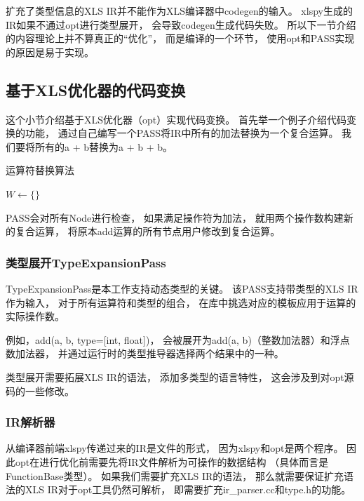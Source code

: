 扩充了类型信息的XLS IR并不能作为XLS编译器中codegen的输入。
xlspy生成的IR如果不通过opt进行类型展开，
会导致codegen生成代码失败。
所以下一节介绍的内容理论上并不算真正的“优化”，
而是编译的一个环节，
使用opt和PASS实现的原因是易于实现。

\subsection{基于XLS优化器的代码变换}

这个小节介绍基于XLS优化器（opt）实现代码变换。
首先举一个例子介绍代码变换的功能，
通过自己编写一个PASS将IR中所有的加法替换为一个复合运算。
我们要将所有的a + b替换为a + b + b。

\begin{algorithm}[H]
\caption{运算符替换算法}
\SetAlgoLined
{}
$W \gets \{\}$\;
\end{algorithm}

PASS会对所有Node进行检查，
如果满足操作符为加法，
就用两个操作数构建新的复合运算，
将原本add运算的所有节点用户修改到复合运算。

\subsubsection{类型展开TypeExpansionPass}\label{typeexpansionpass}

TypeExpansionPass是本工作支持动态类型的关键。
该PASS支持带类型的XLS IR作为输入，
对于所有运算符和类型的组合，
在库中挑选对应的模板应用于运算的实际操作数。

例如，add(a, b, type=[int, float])，
会被展开为add(a, b)（整数加法器）和浮点数加法器，
并通过运行时的类型推导器选择两个结果中的一种。

类型展开需要拓展XLS IR的语法，
添加多类型的语言特性，
这会涉及到对opt源码的一些修改。

\subsubsection{IR解析器}\label{ir_parser}

从编译器前端xlspy传递过来的IR是文件的形式，
因为xlspy和opt是两个程序。
因此opt在进行优化前需要先将IR文件解析为可操作的数据结构
（具体而言是FunctionBase类型）。
如果我们需要扩充XLS IR的语法，
那么就需要保证扩充语法的XLS IR对于opt工具仍然可解析，
即需要扩充ir\_parser.cc和type.h的功能。

